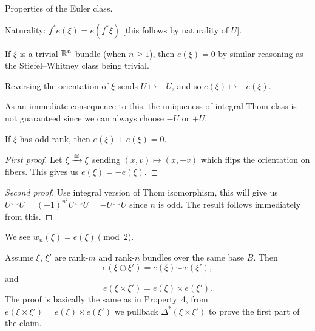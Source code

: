 
\lecture{}

Properties of the Euler class.

\begin{node}[Property 1]
Naturality: $f^{*}e(\xi)=e(f^{*}\xi)$ [this follows by naturality of $U$].
\end{node}

\begin{corollary}
If $\xi$ is a trivial $\mathbb{R}^{n}$-bundle (when $n\geq1$), then
$e(\xi)=0$ by similar reasoning as the Stiefel--Whitney class being trivial.
\end{corollary}

\begin{node}[Property 2]
Reversing the orientation of $\xi$ sends $U\mapsto-U$, and so
$e(\xi)\mapsto-e(\xi)$. 
\end{node}

\begin{remark}
As an immediate consequence to this, the uniqueness of integral Thom
class is not guaranteed since we can always choose $-U$ or $+U$.
\end{remark}

\begin{node}[Property 3]
If $\xi$ has odd rank, then $e(\xi)+e(\xi)=0$.
\end{node}

\begin{proof}[First proof]
Let $\xi\xrightarrow{\cong}\xi$ sending $(x,v)\mapsto(x,-v)$ which
flips the orientation on fibers. This gives us $e(\xi)=-e(\xi)$.
\end{proof}

\begin{proof}[Second proof]
Use integral version of Thom isomorphism, this will give us
$U\smile U=(-1)^{n^{2}}U\smile U=-U\smile U$ since $n$ is odd.
The result follows immediately from this.
\end{proof}

\begin{node}[Property 4]
We see $w_{n}(\xi)=e(\xi)\pmod{2}$.
\end{node}

\begin{node}[Property 5]
Assume $\xi$, $\xi'$ are rank-$m$ and rank-$n$ bundles over the same
base $B$. Then
\begin{equation}
e(\xi\oplus\xi')=e(\xi)\smile e(\xi'),
\end{equation}
and
\begin{equation}
e(\xi\times\xi')=e(\xi)\times e(\xi').
\end{equation}
The proof is basically the same as in Property~4, from
$e(\xi\times\xi')=e(\xi)\times e(\xi')$ we pullback
$\Delta^{*}(\xi\times\xi')$ to prove the first part of the claim.
\end{node}

